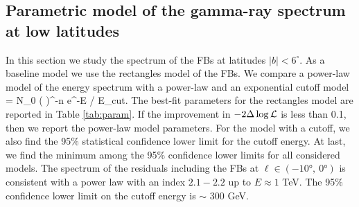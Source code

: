 \subsection{Parametric model of the gamma-ray spectrum at low latitudes}
\label{sec:param_model}

In this section we study the spectrum of the FBs at latitudes $|b| < 6^\circ$.
As a baseline model we use the rectangles model of the FBs.
We compare a power-law model of the energy spectrum with a power-law and an exponential cutoff model
\be
{} = N_0 \left(  \right)^{-n} e^{-E / E_{\rm cut}}.
\ee
The best-fit parameters for the rectangles model are reported in Table \ref{tab:param}.
If the improvement in $-2 \Delta \log {\mathcal{L}}$ is less than 0.1, then we report the power-law model parameters.
For the model with a cutoff, we also find the 95\% statistical confidence lower limit for the cutoff energy.
At last, we find the minimum among the 95\% confidence lower limits for all considered models.
The spectrum of the residuals including the FBs at  $\ell \in (\ang{-10},\ \ang{0})$
is consistent with a power law with an index $2.1 - 2.2$ up to $E \approx 1$ TeV.
The 95\% confidence lower limit on the cutoff energy is $\sim$ 300 GeV.

